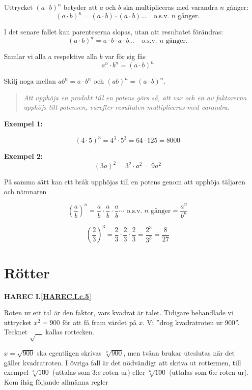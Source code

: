 Uttrycket \((a \cdot b)^n\) betyder att \(a\) och \(b\) ska multipliceras med
varandra \(n\) gånger:
\[
(a \cdot b)^n = (a \cdot b) \cdot (a \cdot b) \ldots
\quad \text{o.s.v. }n\text{ gånger.}
\]

I det senare fallet kan parenteserna slopas, utan att resultatet förändras:
\[
(a \cdot b)^n = a \cdot b \cdot a \cdot b \ldots
\quad \text{o.s.v. }n\text{ gånger.}
\]

Samlar vi alla \(a\) respektive alla \(b\) var för sig fås
\[a^n \cdot b^n = (a \cdot b)^n\]

Skilj noga mellan \(ab^n = a \cdot b^n\) och \((ab)^n = (a \cdot b)^n\).

\begin{quote}\emph{
Att upphöja en produkt till en potens görs så, att var och en av faktorerna
upphöjs till potensen, varefter resultaten multipliceras med varandra.
}\end{quote}

\textbf{Exempel 1:}

\[
(4 \cdot 5)^3 = 4^3 \cdot 5^3 = 64 \cdot 125 = 8000
\]

\textbf{Exempel 2:}
\[
(3a)^2 = 3^2 \cdot a^2 = 9a^2
\]

På samma sätt kan ett bråk upphöjas till en potens genom att upphöja täljaren
och nämnaren

\[
\left(\frac{a}{b}\right)^n =
\frac{a}{b} \cdot \frac{a}{b} \cdot \frac{a}{b} \cdots
\text{ o.s.v. }n\text{ gånger}
= \frac{a^n}{b^n}
\]

\[
\left(\frac{2}{3}\right)^3 = \frac{2}{3} \cdot \frac{2}{3} \cdot \frac{2}{3} =
\frac{2^3}{3^3} = \frac{8}{27}
\]

\section{Rötter}
\textbf{HAREC I.\ref{HAREC.I.c.5}\label{myHAREC.I.c.5}}

Roten ur ett tal är den faktor, vars kvadrat är talet.
Tidigare behandlade vi uttrycket \(x^2 = 900\) för att få fram värdet på \(x\).
Vi ''drog kvadratroten ur 900''.
Tecknet \(\sqrt{\ \ \ \ }\) kallas rottecken.

\(x = \sqrt{900}\) ska egentligen skrivas \(\sqrt[2]{900}\),
men tvåan brukar uteslutas när det gäller kvadratroten.
I övriga fall är det nödvändigt att skriva ut rottermen, till exempel
\(\sqrt[3]{100}\) (uttalas som 3:e roten ur) eller \(\sqrt[6]{100}\)
(uttalas som 6:e roten ur).
Kom ihåg följande allmänna regler

